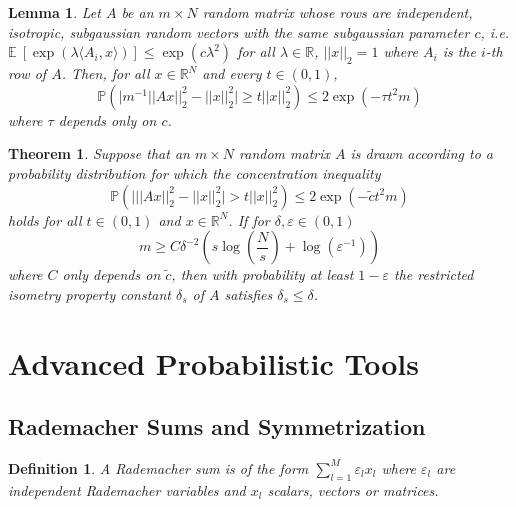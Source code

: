 \documentclass[10pt,a4paper]{article}
\theoremstyle{thmstyle}
\newtheorem{definition}{Definition}
\newtheorem{lemma}{Lemma}
\newtheorem{theorem}{Theorem}
\newcommand{\E}{\mathbb{E}~}
\renewcommand{\Pr}[1]{\mathbb{P}\left( #1 \right)}
\begin{document}
\begin{lemma}
  Let $A$ be an $m \times N$ random matrix whose rows are independent, isotropic, subgaussian random vectors with the same subgaussian parameter $c$, i.e. $\E\left[ \exp(\lambda \langle A_{i}, x \rangle) \right] \le \exp(c \lambda^{2})$ for all $\lambda \in \mathbb{R}$, $||x||_{2} = 1$ where $A_{i}$ is the $i$-th row of $A$.
  Then, for all $x \in \mathbb{R}^{N}$ and every $t \in (0, 1)$,
  \begin{equation*}
    \Pr{\big| m^{-1} ||Ax||_{2}^{2} - ||x||_{2}^{2} \big| \ge t||x||_{2}^{2}} \le 2\exp(-\tau t^{2} m)
  \end{equation*}
  where $\tau$ depends only on $c$.
\end{lemma}

\begin{theorem}
  Suppose that an $m \times N$ random matrix $A$ is drawn according to a probability distribution for which the concentration inequality
  \begin{equation*}
    \Pr{\big| ||Ax||_{2}^{2} - ||x||_{2}^{2} \big| > t||x||_{2}^{2}} \le 2\exp(-\tilde{c}t^{2}m)
  \end{equation*}
  holds for all $t \in (0, 1)$ and $x \in \mathbb{R}^{N}$.
  If for $\delta, \varepsilon \in (0, 1)$
  \begin{equation*}
    m \ge C \delta^{-2} \left( s \log\left( \frac{N}{s} \right) + \log(\varepsilon^{-1}) \right)
  \end{equation*}
  where $C$ only depends on $\tilde{c}$, then with probability at least $1 - \varepsilon$ the restricted isometry property constant $\delta_{s}$ of $A$ satisfies $\delta_{s} \le \delta$.
\end{theorem}

\section{Advanced Probabilistic Tools}

\subsection{Rademacher Sums and Symmetrization}

\begin{definition}
  A \emph{Rademacher sum} is of the form $\sum_{l = 1}^{M} \varepsilon_{l} x_{l}$ where $\varepsilon_{l}$ are independent Rademacher variables and $x_{l}$ scalars, vectors or matrices.
\end{definition}
\end{document}
